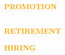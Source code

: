 \documentclass{beamer}
\begin{document}
\begin{frame}
    \centering
    \hspace{-3.5cm}\LARGE{\textbf{\textcolor{orange}{PROMOTION}}} \\
    \vspace{1cm}
    \begin{minipage}{0.41\textwidth}
        
    \end{minipage}\hspace{1cm}
    \begin{minipage}{0.41\textwidth}
        
    \end{minipage}
\end{frame}

\begin{frame}
    \centering
    \begin{columns}
        \begin{column}{.45\textwidth}
        \centering
        \LARGE{\textcolor{orange}{\textbf{RETIREMENT}}} \\
        \vspace{.75cm}

        \LARGE{\textcolor{orange}{\textbf{HIRING}}} \\
        \vspace{.75cm}


\end{column}
\end{columns}
\end{frame}
\end{document}
